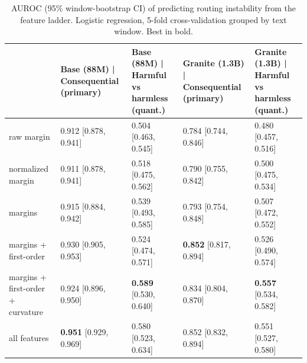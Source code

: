 \begin{table}
\caption{AUROC (95\% window-bootstrap CI) of predicting routing instability from the feature ladder. Logistic regression, 5-fold cross-validation grouped by text window. Best in bold.}
\label{tab:main}
\begin{tabular}{lllll}
\toprule
 & Base (88M) | Consequential (primary) & Base (88M) | Harmful vs harmless (quant.) & Granite (1.3B) | Consequential (primary) & Granite (1.3B) | Harmful vs harmless (quant.) \\
\midrule
raw margin & 0.912 \scriptsize{[0.878, 0.941]} & 0.504 \scriptsize{[0.463, 0.545]} & 0.784 \scriptsize{[0.744, 0.846]} & 0.480 \scriptsize{[0.457, 0.516]} \\
normalized margin & 0.911 \scriptsize{[0.878, 0.941]} & 0.518 \scriptsize{[0.475, 0.562]} & 0.790 \scriptsize{[0.755, 0.842]} & 0.500 \scriptsize{[0.475, 0.534]} \\
margins & 0.915 \scriptsize{[0.884, 0.942]} & 0.539 \scriptsize{[0.493, 0.585]} & 0.793 \scriptsize{[0.754, 0.848]} & 0.507 \scriptsize{[0.472, 0.552]} \\
margins + first-order & 0.930 \scriptsize{[0.905, 0.953]} & 0.524 \scriptsize{[0.474, 0.571]} & \textbf{0.852} \scriptsize{[0.817, 0.894]} & 0.526 \scriptsize{[0.490, 0.574]} \\
margins + first-order + curvature & 0.924 \scriptsize{[0.896, 0.950]} & \textbf{0.589} \scriptsize{[0.530, 0.640]} & 0.834 \scriptsize{[0.804, 0.870]} & \textbf{0.557} \scriptsize{[0.534, 0.582]} \\
all features & \textbf{0.951} \scriptsize{[0.929, 0.969]} & 0.580 \scriptsize{[0.523, 0.634]} & 0.852 \scriptsize{[0.832, 0.894]} & 0.551 \scriptsize{[0.527, 0.580]} \\
\bottomrule
\end{tabular}
\end{table}
